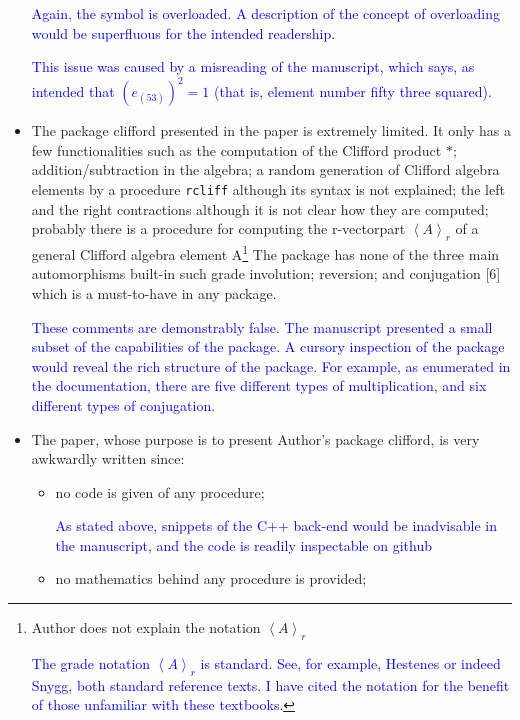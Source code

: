 \documentclass{article}
\begin{document}
\begin{itemize}
{\textcolor{blue}{Again, the {\tt *} symbol is overloaded.  A
  description of the concept of overloading would be superfluous for
  the intended readership.}  }

\textcolor{blue}{This issue was caused by a misreading of the
  manuscript, which says, as intended that $(e_{(53)})^2=1$ (that is,
  element number fifty three squared).}

\item The package clifford presented in the paper is extremely
  limited. It only has a few functionalities such as the computation
  of the Clifford product $*$; addition/subtraction in the algebra; a
  random generation of Clifford algebra elements by a procedure
  \verb+rcliff+ although its syntax is not explained; the left and the
  right contractions although it is not clear how they are computed;
  probably there is a procedure for computing the r-vectorpart
  $\left\langle A\right\rangle_r$ of a general Clifford algebra
  element A\footnote{ Author does not explain the notation
  $\left\langle A\right\rangle_r$

  \textcolor{blue}{The grade notation $\left\langle A\right\rangle_r$
    is standard.  See, for example, Hestenes or indeed Snygg, both
    standard reference texts.  I have cited the notation for the
    benefit of those unfamiliar with these textbooks.}}  The package
  has none of the three main automorphisms built-in such grade
  involution; reversion; and conjugation [6] which is a must-to-have
  in any package.

\textcolor{blue}{These comments are demonstrably false.  The
  manuscript presented a small subset of the capabilities of the
  package.  A cursory inspection of the package would reveal the rich
  structure of the package.  For example, as enumerated in the
  documentation, there are five different types of multiplication, and
  six different types of conjugation.}
  
\item The paper, whose purpose is to present Author’s package clifford, is very awkwardly written
since:

\begin{itemize}
\item no code is given of any procedure;

  \textcolor{blue}{As stated above, snippets of the C++ back-end would
    be inadvisable in the manuscript, and the code is readily
    inspectable on github}
\item  no mathematics behind any procedure is provided;


\end{itemize}
\end{itemize}
\end{document}

